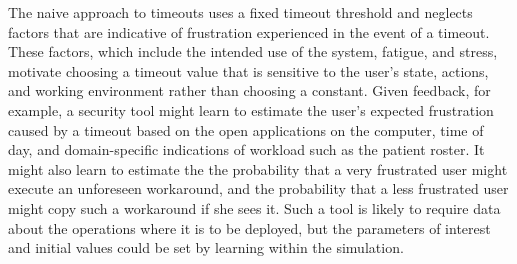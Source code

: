\documentclass{acm_proc_article-sp}
\newcommand{\ignore}[1] {}
\begin{document}
\ignore{\subsection{An Alternative To The Standard Approach}}

The naive approach to timeouts uses a fixed timeout threshold and
neglects factors that are indicative of frustration experienced in the
event of a timeout. These factors, which include the intended use of the
system, fatigue, and stress, motivate choosing a timeout value that is
sensitive to the user's state, actions, and working environment rather
than choosing a constant. Given feedback, for example, a security tool
might learn to estimate the user's expected frustration caused by a
timeout based on the open applications on the computer, time of day,
and domain-specific indications of workload such as the patient
roster.  \ignore{At the same time it might learn to estimate the
  probability of a vulnerability caused by a lengthened timeout in the
  same way and use the two values to reason about the tradeoffs of
  user frustration and near-term security.}  It might also learn to
estimate the the probability that a very frustrated user might execute
an unforeseen workaround, and the probability that a less frustrated
user might copy such a workaround if she sees it.  Such a tool is
likely to require data about the operations where it is to
be deployed, but the parameters of interest and initial values could
be set by learning within the simulation.

\ignore{\subsection{Why Does It Take So Long To Recognize Workarounds?}}

\ignore{\textcolor{red}{this is all speculation... just because users don't report circumvention doesn't mean that system designers will be unaware of it. some solid real-world examples would be nice here-- an image may also be useful: users of system circumvent -> no need for users to complain -> system designers don't hear about it -> security folks' mental models of system remains the same, but the system itself is flawed-- and usage of the system does not mesh with the mental model}}
\end{document}
